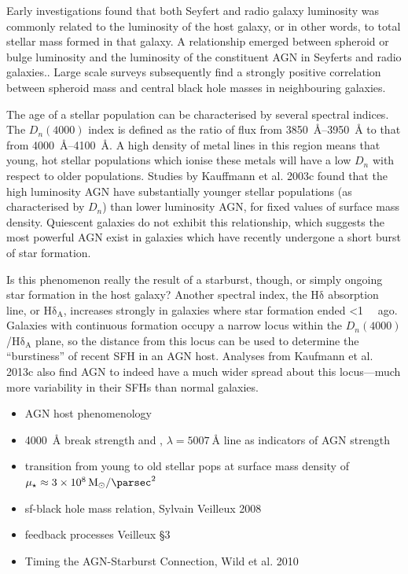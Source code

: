 \documentclass[a4paper,11pt]{article}
\begin{document}
Early investigations found that both Seyfert and radio galaxy luminosity was commonly related to the luminosity of the host galaxy, or in other words, to total stellar mass formed in that galaxy. A relationship emerged between spheroid or bulge luminosity and the luminosity of the constituent AGN in Seyferts and radio galaxies.\cite{Lawrence_1987}. Large scale surveys subsequently find a strongly positive correlation between spheroid mass and central black hole masses in neighbouring galaxies.\cite{Veilleux_2008}


The age of a stellar population can be characterised by several spectral indices. The $D_n(4000)$ index is defined as the ratio of flux from \SIrange{3850}{3950}{\angstrom} to that from \SIrange{4000}{4100}{\angstrom}. A high density of metal lines in this region means that young, hot stellar populations which ionise these metals will have a low $D_n$ with respect to older populations.\cite{Kauffmann_2003a} Studies by Kauffmann et al. 2003c found that the high luminosity AGN have substantially younger stellar populations (as characterised by $D_n$) than lower luminosity AGN, for fixed values of surface mass density. Quiescent galaxies do not exhibit this relationship, which suggests the most powerful AGN exist in galaxies which have recently undergone a short burst of star formation.\cite{Kauffmann_2003c}

Is this phenomenon really the result of a starburst, though, or simply ongoing star formation in the host galaxy? Another spectral index, the $\mathrm{H\delta}$ absorption line, or $\mathrm{H\delta_A}$, increases strongly in galaxies where star formation ended \textless \SI{1}{\giga\year} ago. Galaxies with continuous formation occupy a narrow locus within the $D_n(4000)$/$\mathrm{H\delta_A}$ plane, so the distance from this locus can be used to determine the ``burstiness'' of recent SFH in an AGN host. Analyses from Kaufmann et al. 2013c also find AGN to indeed have a much wider spread about this locus---much more variability in their SFHs than normal galaxies.\cite{Kauffmann_2003c}


\begin{itemize}
  \item AGN host phenomenology \cite{Lawrence_1987}
  \item \SI{4000}{\angstrom} break strength and , $\lambda=\SI{5007}{\angstrom}$ line as indicators of AGN strength\cite{Kauffmann_2003c}
  \item transition from young to old stellar pops at surface mass density of $\mu_\star\approx\SI{3e8}{M_\odot\per\square\parsec}$\cite{Kauffmann_2003c}
  \item sf-black hole mass relation, Sylvain Veilleux 2008 \cite{Veilleux_2008}
  \item feedback processes Veilleux \S 3 \cite{Veilleux_2008}
  \item Timing the AGN-Starburst Connection, Wild et al. 2010 \cite{Wild_2010}
\end{itemize}
\end{document}
